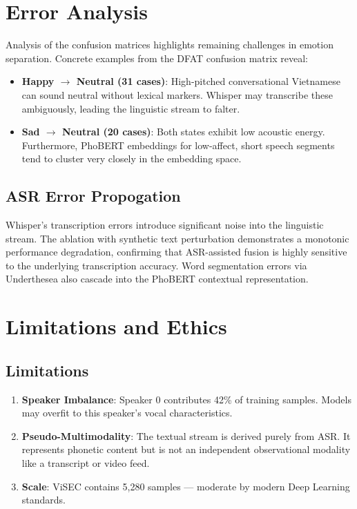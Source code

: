 \documentclass[12pt,a4paper]{report}
\begin{document}
\chapter{Error Analysis}

Analysis of the confusion matrices highlights remaining challenges in emotion separation. Concrete examples from the DFAT confusion matrix reveal:
\begin{itemize}
    \item \textbf{Happy $\rightarrow$ Neutral (31 cases)}: High-pitched conversational Vietnamese can sound neutral without lexical markers. Whisper may transcribe these ambiguously, leading the linguistic stream to falter.
    \item \textbf{Sad $\rightarrow$ Neutral (20 cases)}: Both states exhibit low acoustic energy. Furthermore, PhoBERT embeddings for low-affect, short speech segments tend to cluster very closely in the embedding space.
\end{itemize}

\section{ASR Error Propogation}
Whisper's transcription errors introduce significant noise into the linguistic stream. The ablation with synthetic text perturbation demonstrates a monotonic performance degradation, confirming that ASR-assisted fusion is highly sensitive to the underlying transcription accuracy. Word segmentation errors via Underthesea also cascade into the PhoBERT contextual representation.

\chapter{Limitations and Ethics}

\section{Limitations}
\begin{enumerate}
    \item \textbf{Speaker Imbalance}: Speaker 0 contributes 42\% of training samples. Models may overfit to this speaker's vocal characteristics.
    \item \textbf{Pseudo-Multimodality}: The textual stream is derived purely from ASR. It represents phonetic content but is not an independent observational modality like a transcript or video feed.
    \item \textbf{Scale}: ViSEC contains 5,280 samples — moderate by modern Deep Learning standards.
\end{enumerate}
\end{document}
